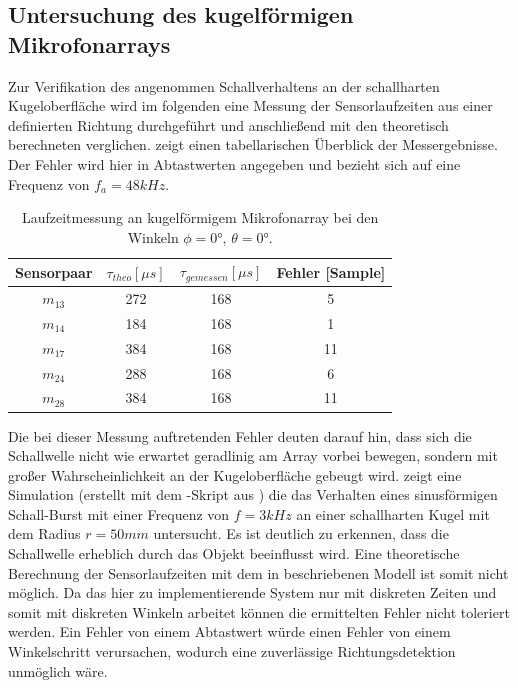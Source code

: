 \subsection{Untersuchung des kugelförmigen Mikrofonarrays}
\label{sec:UntersuchungKugelArrays}
Zur Verifikation des angenommen Schallverhaltens an der schallharten Kugeloberfläche wird im folgenden eine Messung der Sensorlaufzeiten aus einer definierten Richtung durchgeführt und anschließend mit den theoretisch berechneten verglichen.  zeigt einen tabellarischen Überblick der Messergebnisse. Der Fehler wird hier in Abtastwerten angegeben und bezieht sich auf eine Frequenz von $f_a=48kHz$. 

\begin{table}[h!]
     \center
     \begin{tabular}{cccc}
          \hline
          Sensorpaar & $\tau_{theo} [\mu s ]$ & $\tau_{gemessen} [\mu s ]$ & Fehler [Sample] \\
          \hline \hline
          $m_{13}$    &    272                  &  168                        & 5     \\
          $m_{14}$    &    184                & 168                       & 1  \\
          $m_{17}$    &    384                & 168                       & 11  \\
          $m_{24}$    &    288                  & 168                        & 6  \\
          $m_{28}$    &    384                  & 168                         & 11     \\
          \hline 
     \end{tabular}
  \caption{Laufzeitmessung an kugelförmigem Mikrofonarray bei den Winkeln $\phi=0°$, $\theta = 0°$.}
 \label{tab:KugelArray_Laufzeitmessung}
 \end{table}


Die bei dieser Messung auftretenden Fehler deuten darauf hin, dass sich die Schallwelle nicht wie erwartet geradlinig am Array vorbei bewegen, sondern mit großer Wahrscheinlichkeit an der Kugeloberfläche gebeugt wird.  zeigt eine Simulation (erstellt mit dem \matlab-Skript aus \cite{web_sim_wave}) die das Verhalten eines sinusförmigen Schall-Burst mit einer Frequenz von $f=3kHz$ an einer schallharten Kugel mit dem Radius $r=50mm$ untersucht. Es ist deutlich zu erkennen, dass die Schallwelle erheblich durch das Objekt beeinflusst wird. Eine theoretische Berechnung der Sensorlaufzeiten mit dem in  beschriebenen Modell ist somit nicht möglich. Da das hier zu implementierende System nur mit diskreten Zeiten und somit mit diskreten Winkeln arbeitet können die ermittelten Fehler nicht toleriert werden. Ein Fehler von einem Abtastwert würde einen Fehler von einem Winkelschritt verursachen, wodurch eine zuverlässige Richtungsdetektion unmöglich wäre.


